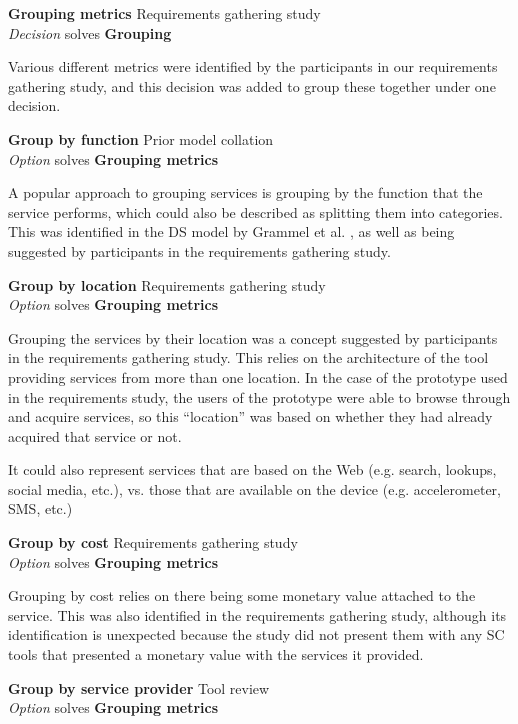 \textbf{Grouping metrics} \hfill Requirements gathering study \\ \emph{Decision} \hfill solves \textbf{Grouping}

Various different metrics were identified by the participants in our requirements gathering study, and this decision was added to group these together under one decision.

\textbf{Group by function} \hfill Prior model collation \cite{Grammel2010} \\ \emph{Option} \hfill solves \textbf{Grouping metrics}

A popular approach to grouping services is grouping by the function that the service performs, which could also be described as splitting them into categories. This was identified in the DS model by Grammel et al. \cite{Grammel2010}, as well as being suggested by participants in the requirements gathering study.

\textbf{Group by location} \hfill Requirements gathering study \\ \emph{Option} \hfill solves \textbf{Grouping metrics}

Grouping the services by their location was a concept suggested by participants in the requirements gathering study. This relies on the architecture of the tool providing services from more than one location. In the case of the prototype used in the requirements study, the users of the prototype were able to browse through and acquire services, so this ``location'' was based on whether they had already acquired that service or not.

It could also represent services that are based on the Web (e.g. search, lookups, social media, etc.), vs. those that are available on the device (e.g. accelerometer, SMS, etc.)

\textbf{Group by cost} \hfill Requirements gathering study \\ \emph{Option} \hfill solves \textbf{Grouping metrics}

Grouping by cost relies on there being some monetary value attached to the service. This was also identified in the requirements gathering study, although its identification is unexpected because the study did not present them with any SC tools that presented a monetary value with the services it provided.

\textbf{Group by service provider} \hfill Tool review \\ \emph{Option} \hfill solves \textbf{Grouping metrics}

